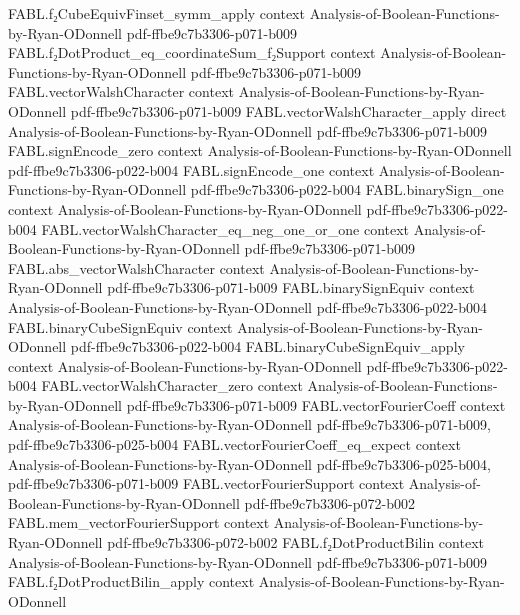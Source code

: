 \begin{theorem}
\proofstep
  {FABL.f₂CubeEquivFinset_symm_apply}
  {context}
  {Analysis-of-Boolean-Functions-by-Ryan-ODonnell}
  {pdf-ffbe9c7b3306-p071-b009}
\proofstep
  {FABL.f₂DotProduct_eq_coordinateSum_f₂Support}
  {context}
  {Analysis-of-Boolean-Functions-by-Ryan-ODonnell}
  {pdf-ffbe9c7b3306-p071-b009}
\proofstep
  {FABL.vectorWalshCharacter}
  {context}
  {Analysis-of-Boolean-Functions-by-Ryan-ODonnell}
  {pdf-ffbe9c7b3306-p071-b009}
\proofstep
  {FABL.vectorWalshCharacter_apply}
  {direct}
  {Analysis-of-Boolean-Functions-by-Ryan-ODonnell}
  {pdf-ffbe9c7b3306-p071-b009}
\proofstep
  {FABL.signEncode_zero}
  {context}
  {Analysis-of-Boolean-Functions-by-Ryan-ODonnell}
  {pdf-ffbe9c7b3306-p022-b004}
\proofstep
  {FABL.signEncode_one}
  {context}
  {Analysis-of-Boolean-Functions-by-Ryan-ODonnell}
  {pdf-ffbe9c7b3306-p022-b004}
\proofstep
  {FABL.binarySign_one}
  {context}
  {Analysis-of-Boolean-Functions-by-Ryan-ODonnell}
  {pdf-ffbe9c7b3306-p022-b004}
\proofstep
  {FABL.vectorWalshCharacter_eq_neg_one_or_one}
  {context}
  {Analysis-of-Boolean-Functions-by-Ryan-ODonnell}
  {pdf-ffbe9c7b3306-p071-b009}
\proofstep
  {FABL.abs_vectorWalshCharacter}
  {context}
  {Analysis-of-Boolean-Functions-by-Ryan-ODonnell}
  {pdf-ffbe9c7b3306-p071-b009}
\proofstep
  {FABL.binarySignEquiv}
  {context}
  {Analysis-of-Boolean-Functions-by-Ryan-ODonnell}
  {pdf-ffbe9c7b3306-p022-b004}
\proofstep
  {FABL.binaryCubeSignEquiv}
  {context}
  {Analysis-of-Boolean-Functions-by-Ryan-ODonnell}
  {pdf-ffbe9c7b3306-p022-b004}
\proofstep
  {FABL.binaryCubeSignEquiv_apply}
  {context}
  {Analysis-of-Boolean-Functions-by-Ryan-ODonnell}
  {pdf-ffbe9c7b3306-p022-b004}
\proofstep
  {FABL.vectorWalshCharacter_zero}
  {context}
  {Analysis-of-Boolean-Functions-by-Ryan-ODonnell}
  {pdf-ffbe9c7b3306-p071-b009}
\proofstep
  {FABL.vectorFourierCoeff}
  {context}
  {Analysis-of-Boolean-Functions-by-Ryan-ODonnell}
  {pdf-ffbe9c7b3306-p071-b009,
    pdf-ffbe9c7b3306-p025-b004}
\proofstep
  {FABL.vectorFourierCoeff_eq_expect}
  {context}
  {Analysis-of-Boolean-Functions-by-Ryan-ODonnell}
  {pdf-ffbe9c7b3306-p025-b004,
    pdf-ffbe9c7b3306-p071-b009}
\proofstep
  {FABL.vectorFourierSupport}
  {context}
  {Analysis-of-Boolean-Functions-by-Ryan-ODonnell}
  {pdf-ffbe9c7b3306-p072-b002}
\proofstep
  {FABL.mem_vectorFourierSupport}
  {context}
  {Analysis-of-Boolean-Functions-by-Ryan-ODonnell}
  {pdf-ffbe9c7b3306-p072-b002}
\proofstep
  {FABL.f₂DotProductBilin}
  {context}
  {Analysis-of-Boolean-Functions-by-Ryan-ODonnell}
  {pdf-ffbe9c7b3306-p071-b009}
\proofstep
  {FABL.f₂DotProductBilin_apply}
  {context}
  {Analysis-of-Boolean-Functions-by-Ryan-ODonnell}

\end{theorem}
